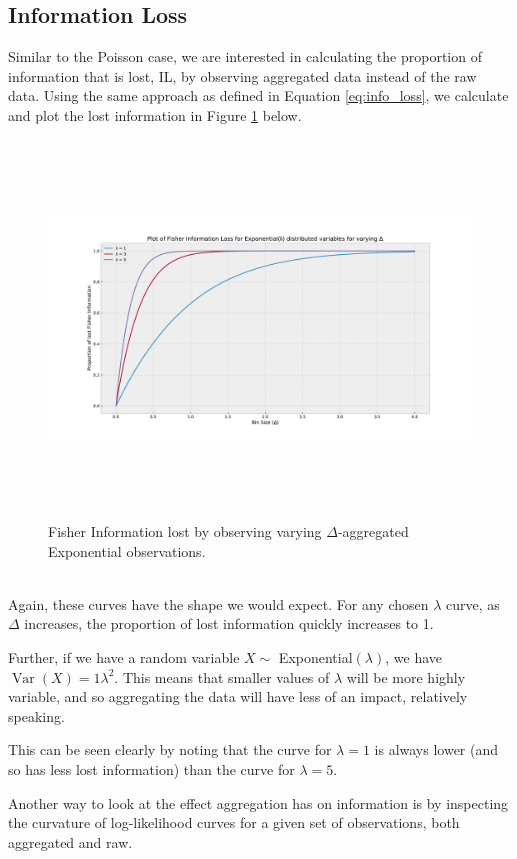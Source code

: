 \documentclass[11pt,a4,twosided,singlespacing,titlepagenumber=on,numbers=endperiod]{scrreprt}
\numberwithin{equation}{chapter} %
\theoremstyle{remark}
\DeclareMathOperator{\var}{Var}
\begin{document}
\subsection{Information Loss}
Similar to the Poisson case, we are interested in calculating the proportion of information that is lost, IL, by observing aggregated data instead of the raw data. Using the same approach as defined in Equation \ref{eq:info_loss}, we calculate and plot the lost information in Figure \ref{fig:exp_info_loss} below.
\begin{figure}[!h]
	\includegraphics[height=10cm, width=14cm]{exp_info_loss.pdf}
	\centering
	\caption{Fisher Information lost by observing varying $\Delta$-aggregated Exponential observations.}
	\label{fig:exp_info_loss}
\end{figure}\\\noindent
Again, these curves have the shape we would expect. For any chosen $\lambda$ curve, as $\Delta$ increases, the proportion of lost information quickly increases to 1.

Further, if we have a random variable $X \sim $ Exponential$(\lambda)$, we have $\var(X) = 1\lambda^2$. This means that smaller values of $\lambda$ will be more highly variable, and so aggregating the data will have less of an impact, relatively speaking.

This can be seen clearly by noting that the curve for $\lambda=1$ is always lower (and so has less lost information) than the curve for $\lambda=5$.

\newpage\noindent
Another way to look at the effect aggregation has on information is by inspecting the curvature of log-likelihood curves for a given set of observations, both aggregated and raw.
\end{document}
